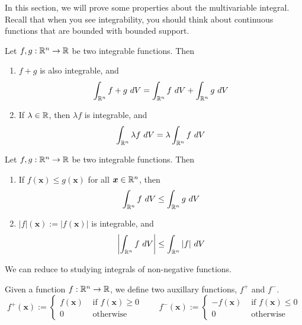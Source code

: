 In this section, we will prove some properties about the multivariable integral.  Recall that when you see integrability, you should think about continuous functions that are bounded with bounded support.

\begin{theorem}
    
    Let $f, g : \mathbb{R}^n \to \mathbb{R}$ be two integrable functions.  Then
    
    \begin{enumerate}
        \item $f+g$ is also integrable, and
        $$\int_{\R^n} f+g \ dV = \int_{\R^n} f \ dV + \int_{\R^n} g \ dV$$
        \item If $\lambda \in \mathbb{R}$, then $\lambda f$ is integrable, and 
        $$\int_{\R^n} \lambda f \ dV = \lambda \int_{\R^n} f \ dV$$
        
    \end{enumerate}
    \end{theorem}

    \begin{theorem}
    
    Let $f, g : \mathbb{R}^n \to \mathbb{R}$ be two integrable functions.  Then
    
    \begin{enumerate}
        \item If $f(\bm{x}) \leq g(\bm{x})$ for all $\bm{x} \in \mathbb{R}^n$, then $$\int_{\R^n} f \ dV \leq \int_{\R^n} g \ dV$$
        \item $|f|(\bm{x}) := |f(\bm{x})|$ is integrable, and $$\left|\int_{\R^n} f \ dV\right| \leq \int_{\R^n} |f| \ dV$$
    \end{enumerate}
    
    \end{theorem}

    \begin{corollary}
    We can reduce to studying integrals of non-negative functions.
    \end{corollary}
    
    \begin{definition}
    Given a function $f : \mathbb{R}^n \to \mathbb{R}$, we define two auxillary functions, $f^+$ and $f^-$.
    $$f^+(\bm{x}) := \left\{
		\begin{array}{ll}
			f(\bm{x}) & \text{ if } f(\bm{x}) \geq 0 \\
			0 & \text{ otherwise}
		\end{array}
		\right. \qquad f^-(\bm{x}) := \left\{
		\begin{array}{ll}
			-f(\bm{x}) & \text{ if } f(\bm{x}) \leq 0 \\
			0 & \text{ otherwise}
		\end{array}
		\right.$$
    
    \end{definition}
    
